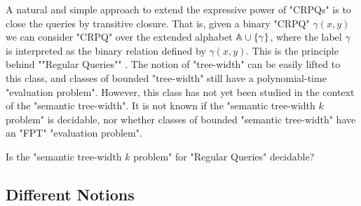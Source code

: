 A natural and simple approach to extend the expressive power of "CRPQs" is to close the queries by transitive closure. That is, given a binary "CRPQ" $\gamma(x,y)$ we can consider "CRPQ" over the extended alphabet $\mathbb{A} \cup \{\gamma\}$, where the label $\gamma$ is interpreted as the binary relation defined by $\gamma(x,y)$. \AP This is the principle behind ""Regular Queries"" \cite{ReutterRomeroVardi2017RegularQueries}. The notion of "tree-width" can be easily lifted to this class, and classes of bounded "tree-width" still have a polynomial-time "evaluation problem". However, this class has not yet been studied in the context of the "semantic tree-width". It is not known if the "semantic tree-width $k$ problem" is decidable, nor whether classes of bounded "semantic tree-width" have an "FPT" "evaluation problem".
\begin{question}
    Is the "semantic tree-width $k$ problem" for "Regular Queries" decidable?
\end{question}

\subsection{\AP{}Different Notions}
\label{sec:discussion-different-notions}

